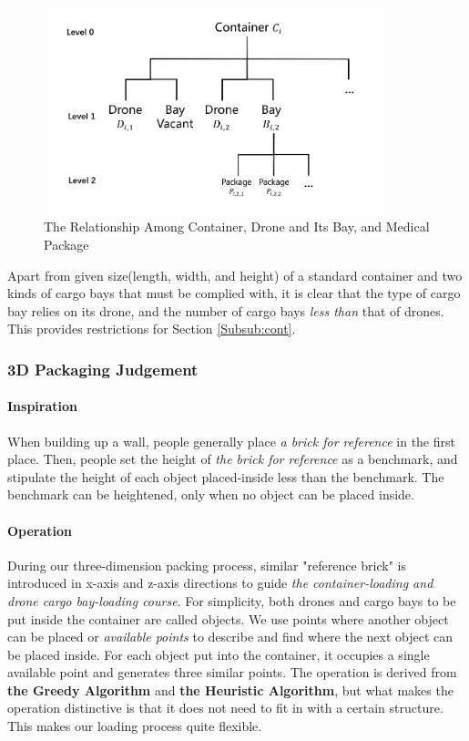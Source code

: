 \documentclass{mcmthesis}
\begin{document}
\begin{figure}[htbp]
    \centering
    \includegraphics[height=6cm,width=10cm]{figures/relationship2.png}
    \caption{The Relationship Among Container, Drone and Its Bay, and Medical Package}
    \label{Fig:ther}
\end{figure}

Apart from given size(length, width, and height) of a standard container and two kinds of cargo bays that must be complied with, it is clear that the type of cargo bay relies on its drone, and the number of cargo bays \emph{less than} that of drones. This provides restrictions for Section \ref{Subsub:cont}.

\subsubsection{3D Packaging Judgement}\label{Sec:3dpa}

\paragraph{Inspiration}When building up a wall, people generally place \emph{a brick for reference} in the first place. Then, people set the height of \emph{the brick for reference} as a benchmark, and stipulate the height of each object placed-inside less than the benchmark. The benchmark can be heightened, only when no object can be placed inside.

\paragraph{Operation}During our three-dimension packing process, similar "reference brick" is introduced in x-axis and z-axis directions to guide \emph{the container-loading and drone cargo bay-loading course}. For simplicity, both drones and cargo bays to be put inside the container are called objects. We use points where another object can be placed or \emph{available points} to describe and find where the next object can be placed inside. For each object put into the container, it occupies a single available point and generates three similar points. The operation is derived from \textbf{the Greedy Algorithm} and \textbf{the Heuristic Algorithm}, but what makes the operation distinctive is that it does not need to fit in with a certain structure. This makes our loading process quite flexible.
\end{document}
